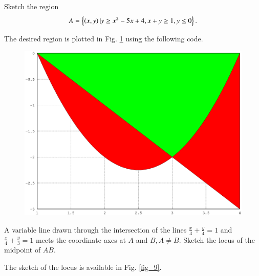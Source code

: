 \documentclass[journal,12pt,twocolumn]{IEEEtran}
\begin{document}
\renewcommand{\thefigure}{\theproblem}
\begin{problem}
Sketch the region
\begin{equation}
A = \left\{\left(x,y\right)\vert y \geq x^2-5x+4, x + y \geq 1, y \leq 0\right\}.
\end{equation}
%
\end{problem}
\solution The desired region is plotted in Fig. \ref{fig_8} using the following code.

\begin{figure}
\begin{center}
\includegraphics[width=\columnwidth]{./figs/ee16b1008}
\end{center}
\label{fig_8}	
\end{figure}
%
\begin{problem}
A variable line drawn through the intersection of the lines $\frac{x}{3} + \frac{y}{4} = 1$ and $\frac{x}{4} + \frac{y}{3} = 1$ meets the coordinate axes at $A$ and $B, A \neq B$.  Sketch the locus of the midpoint of $AB$.
\end{problem}
\solution

The sketch of the locus is available in Fig. \ref{fig_9}.

\end{document}
